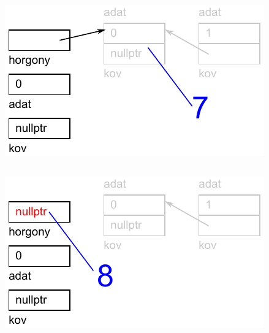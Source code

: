 \begin{frame}
  \begin{columns}[c]
      \footnotesize
      \begin{exampleblock}{}
        
      \end{exampleblock}
      \includegraphics[width=\textwidth]{verem/verem16.pdf}
  \end{columns}
\end{frame}

\begin{frame}
  \begin{columns}[c]
      \footnotesize
      \begin{exampleblock}{}
        
      \end{exampleblock}
      \includegraphics[width=\textwidth]{verem/verem17.pdf}
  \end{columns}
\end{frame}